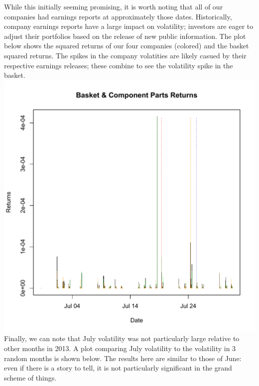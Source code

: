 \documentclass[11pt]{amsart}
\begin{document}
While this initially seeming promising, it is worth noting that all of our companies had earnings reports at approximately those dates. Historically, company earnings reports have a large impact on volatility; investors are eager to adjust their portfolios based on the release of new public information. The plot below shows the squared returns of our four companies (colored) and the basket squared returns. The spikes in the company volatities are likely casued by their respective earnings releases; these combine to see the volatility spike in the basket. \\

\includegraphics[scale=0.5]{july_earnings.pdf} \\

Finally, we can note that July volatility was not particularly large relative to other months in 2013. A plot comparing July volatility to the volatility in 3 random months is shown below. The results here are similar to those of June: even if there is a story to tell, it is not particularly significant in the grand scheme of things. \\
\end{document}

